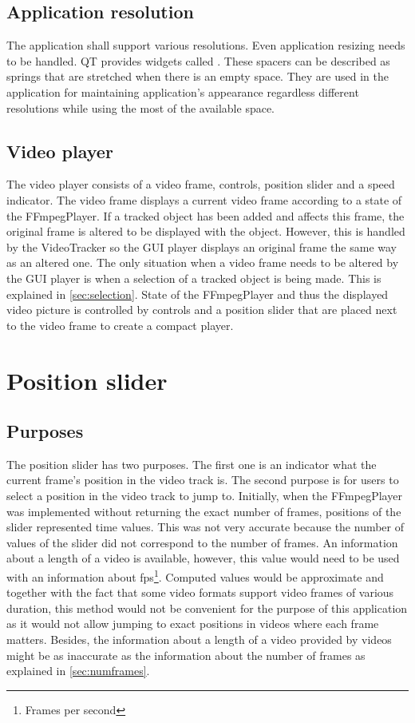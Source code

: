 \subsection{Application resolution}
The application shall support various resolutions. Even application resizing needs to be handled. QT provides widgets called . These spacers can be described as springs that are stretched when there is an empty space. They are used in the application for maintaining application's appearance regardless different resolutions while using the most of the available space.

\subsection{Video player}
The video player consists of a video frame, controls, position slider and a speed indicator. The video frame displays a current video frame according to a state of the FFmpegPlayer. If a tracked object has been added and affects this frame, the original frame is altered to be displayed with the object. However, this is handled by the VideoTracker so the GUI player displays an original frame the same way as an altered one. The only situation when a video frame needs to be altered by the GUI player is when a selection of a tracked object is being made. This is explained in \autoref{sec:selection}. State of the FFmpegPlayer and thus the displayed video picture is controlled by controls and a position slider that are placed next to the video frame to create a compact player.

\section{Position slider}
\subsection{Purposes}
The position slider has two purposes. The first one is an indicator what the current frame’s position in the video track is. The second purpose is for users to select a position in the video track to jump to. Initially, when the FFmpegPlayer was implemented without returning the exact number of frames, positions of the slider represented time values. This was not very accurate because the number of values of the slider did not correspond to the number of frames. An information about a length of a video is available, however, this value would need to be used with an information about fps\footnote{Frames per second}. Computed values would be approximate and together with the fact that some video formats support video frames of various duration, this method would not be convenient for the purpose of this application as it would not allow jumping to exact positions in videos where each frame matters. Besides, the information about a length of a video provided by videos might be as inaccurate as the information about the number of frames as explained in \autoref{sec:numframes}.

